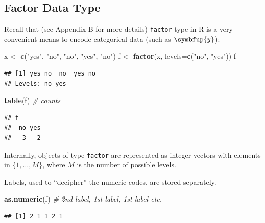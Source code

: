 \documentclass[10pt,b5paper,krantz1]{krantz}
\newenvironment{Shaded}{\begin{snugshade}}{\end{snugshade}}
\newcommand{\CommentTok}[1]{\textcolor[rgb]{0.37,0.37,0.37}{\textit{#1}}}
\newcommand{\DataTypeTok}[1]{\textcolor[rgb]{0.27,0.27,0.27}{#1}}
\newcommand{\KeywordTok}[1]{\textcolor[rgb]{0.27,0.27,0.27}{\textbf{#1}}}
\newcommand{\NormalTok}[1]{#1}
\newcommand{\StringTok}[1]{\textcolor[rgb]{0.5,0.5,0.5}{#1}}
\renewcommand{\mathbf}[1]{\symbfup{#1}}
\begin{document}
\hypertarget{factor-data-type}{%
\subsection{Factor Data Type}\label{factor-data-type}}

Recall that (see Appendix B for more details)
\texttt{factor} type in R is a very convenient means to encode categorical data
(such as \(\mathbf{y}\)):

\begin{Shaded}
\begin{Highlighting}[]
\NormalTok{x <-}\StringTok{ }\KeywordTok{c}\NormalTok{(}\StringTok{"yes"}\NormalTok{, }\StringTok{"no"}\NormalTok{, }\StringTok{"no"}\NormalTok{, }\StringTok{"yes"}\NormalTok{, }\StringTok{"no"}\NormalTok{)}
\NormalTok{f <-}\StringTok{ }\KeywordTok{factor}\NormalTok{(x, }\DataTypeTok{levels=}\KeywordTok{c}\NormalTok{(}\StringTok{"no"}\NormalTok{, }\StringTok{"yes"}\NormalTok{))}
\NormalTok{f}
\end{Highlighting}
\end{Shaded}

\begin{verbatim}
## [1] yes no  no  yes no 
## Levels: no yes
\end{verbatim}

\begin{Shaded}
\begin{Highlighting}[]
\KeywordTok{table}\NormalTok{(f) }\CommentTok{# counts}
\end{Highlighting}
\end{Shaded}

\begin{verbatim}
## f
##  no yes 
##   3   2
\end{verbatim}

Internally, objects of type \texttt{factor} are represented as integer vectors
with elements in \(\{1,\dots,M\}\), where \(M\) is the number of possible levels.

Labels, used to ``decipher'' the numeric codes, are stored separately.

\begin{Shaded}
\begin{Highlighting}[]
\KeywordTok{as.numeric}\NormalTok{(f) }\CommentTok{# 2nd label, 1st label, 1st label etc.}
\end{Highlighting}
\end{Shaded}

\begin{verbatim}
## [1] 2 1 1 2 1
\end{verbatim}
\end{document}
